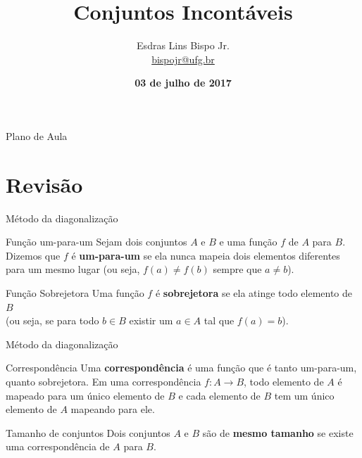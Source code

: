 \documentclass[xcolor=dvipsnames,table]{beamer}
\title{Conjuntos Incontáveis}
\author{
  Esdras Lins Bispo Jr. \\ \url{bispojr@ufg.br}
  }
\institute{
  Teoria da Computação \\Bacharelado em Ciência da Computação}
\date{\textbf{03 de julho de 2017} }
\begin{document}
	\begin{frame}
		\titlepage
	\end{frame}

	\AtBeginSection{
		\begin{frame}{Sumário}%
    		\tableofcontents[currentsection]
		\end{frame}
	}

	\begin{frame}{Plano de Aula}
		\tableofcontents
	\end{frame}
    
    \section{Revisão}
	
	\begin{frame}{Método da diagonalização}
		\begin{block}{Função um-para-um}
			Sejam dois conjuntos $A$ e $B$ e uma função $f$ de $A$ para $B$. Dizemos que $f$ é {\bf um-para-um} se ela nunca mapeia dois elementos diferentes para um mesmo lugar (ou seja, $f(a) \not= f(b)$ sempre que $a \not= b$).
		\end{block}	 	
		\begin{block}{Função Sobrejetora}		
			Uma função $f$ é {\bf sobrejetora} se ela atinge todo elemento de $B$ \\(ou seja, se para todo $b \in B$ existir um $a \in A$ tal que $f(a) = b$).
		\end{block} 
	\end{frame}
	
	\begin{frame}{Método da diagonalização}
		\begin{block}{Correspondência}
			Uma {\bf correspondência} é uma função que é tanto um-para-um, quanto sobrejetora. Em uma correspondência $f : A \rightarrow B$, todo elemento de $A$ é mapeado para um único elemento de $B$ e cada elemento de $B$ tem um único elemento de $A$ mapeando para ele. 
		\end{block}  
		\begin{block}{Tamanho de conjuntos}
			Dois conjuntos $A$ e $B$ são de {\bf mesmo tamanho} se existe uma correspondência de $A$ para $B$.
		\end{block}
	\end{frame}
	
\end{document}
